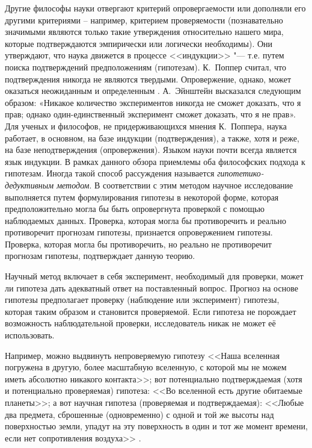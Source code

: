 Другие философы науки отвергают критерий опровергаемости или дополняли его другими критериями – например, критерием 
проверяемости (познавательно значимыми являются только такие утверждения относительно нашего мира, которые 
подтверждаются эмпирически или логически необходимы). Они утверждают, что наука движется в процессе 
<<индукции>> "--- т.е. путем поиска подтверждений предположениям (гипотезам). К.~Поппер считал, что подтверждения 
никогда не являются твердыми. Опровержение, однако, может оказаться неожиданным и определенным \cite{Popper2005}. 
А.~Эйнштейн высказался следующим образом: «Никакое количество экспериментов никогда не сможет доказать, что я прав; 
однако один-единственный эксперимент сможет доказать, что я не прав». Для ученых и философов, не придерживающихся 
мнения К.~Поппера, наука работает, в основном, на базе индукции (подтверждения), а также, хотя и реже, на базе 
неподтверждения (опровержения). Языком науки почти всегда является язык индукции. В рамках данного обзора приемлемы 
оба философских подхода к гипотезам. Иногда такой способ рассуждения называется 
\textit{гипотетико-дедуктивным методом}. В соответствии с этим методом научное исследование выполняется путем 
формулирования гипотезы в некоторой форме, которая предположительно могла бы быть опровергнута проверкой с помощью 
наблюдаемых данных. Проверка, которая могла бы противоречить и реально противоречит прогнозам гипотезы, признается 
опровержением гипотезы. Проверка, которая могла бы противоречить, но реально не противоречит прогнозам гипотезы, 
подтверждает данную теорию.

Научный метод включает в себя эксперимент, необходимый для проверки, может ли гипотеза дать адекватный ответ на 
поставленный вопрос. Прогноз на основе гипотезы предполагает проверку (наблюдение или эксперимент) гипотезы, которая 
таким образом и становится проверяемой. Если гипотеза не порождает возможность наблюдательной проверки, исследователь 
никак не может её использовать.

Например, можно выдвинуть непроверяемую гипотезу <<Наша вселенная погружена в другую, более масштабную вселенную, с 
которой мы не можем иметь абсолютно никакого контакта>>; вот потенциально подтверждаемая (хотя и потенциально 
проверяемая) гипотеза: <<Во вселенной есть другие обитаемые планеты>>; а вот научная гипотеза (проверяемая и 
подтверждаемая): <<Любые два предмета, сброшенные (одновременно) с одной и той же высоты над поверхностью земли, 
упадут на эту поверхность в один и тот же момент времени, если нет сопротивления воздуха>> \cite{Stanbrough2022}.

